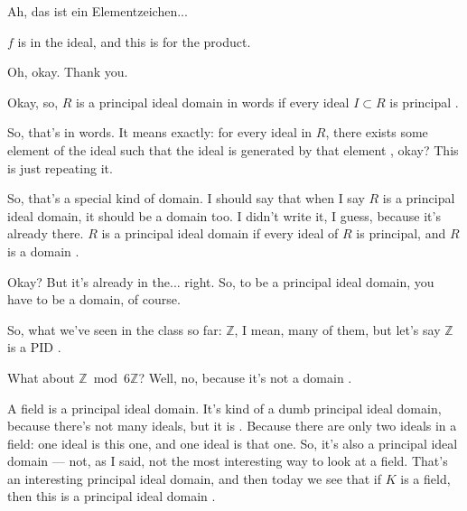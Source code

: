 \begin{student}
Ah, das ist ein Elementzeichen... 
\end{student}

\begin{speech}[00:40:09 - 00:40:29]
$f$ is in the ideal, and this is for the product.
\end{speech}

\begin{student}
Oh, okay. Thank you.
\end{student}

\begin{speech}[00:40:29 - 00:41:37]
Okay, so, $R$ is a principal ideal domain in words if every ideal $I \subset R$ is principal .

So, that's in words. It means exactly: for every ideal in $R$, there exists some element of the ideal such that the ideal is generated by that element , okay? This is just repeating it.

So, that's a special kind of domain. I should say that when I say $R$ is a principal ideal domain, it should be a domain too. I didn't write it, I guess, because it's already there. $R$ is a principal ideal domain if every ideal of $R$ is principal, and $R$ is a domain .

Okay? But it's already in the... right. So, to be a principal ideal domain, you have to be a domain, of course.

So, what we've seen in the class so far: $\mathbb{Z}$, I mean, many of them, but let's say $\mathbb{Z}$ is a PID .

What about $\mathbb{Z} \bmod 6\mathbb{Z}$?  Well, no, because it's not a domain .

A field is a principal ideal domain. It's kind of a dumb principal ideal domain, because there's not many ideals, but it is . Because there are only two ideals in a field: one ideal is this one, and one ideal is that one. So, it's also a principal ideal domain --- not, as I said, not the most interesting way to look at a field. That's an interesting principal ideal domain, and then today we see that if $K$ is a field, then this is a principal ideal domain .
\end{speech}

